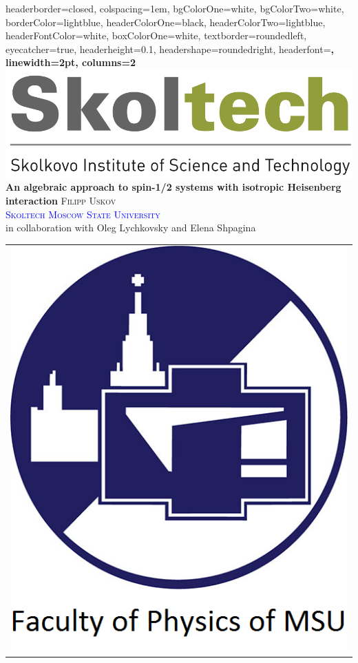 \documentclass[portratit,a1paper,fontscale=0.58]{baposter} %
\begin{document}
\begin{poster}
{
headerborder=closed, %
colspacing=1em, %
bgColorOne=white, %
bgColorTwo=white, %
borderColor=lightblue, %
headerColorOne=black, %
headerColorTwo=lightblue, %
headerFontColor=white, %
boxColorOne=white, %
textborder=roundedleft, %
eyecatcher=true, %
headerheight=0.1\textheight, %
headershape=roundedright, %
headerfont=\Large\bf\textsc, %
linewidth=2pt, %
columns=2
}
%
{\includegraphics[height=4 em]{skoltech_logo.png}} %
{
\bf{\LARGE An algebraic approach to spin-1/2 systems with isotropic Heisenberg interaction}
\vspace{0.4em}
} %
{\textsc{ \large Filipp Uskov  \\
\vspace{5 pt}
\textcolor{blue}{Skoltech}    \hspace{12pt} \textcolor{blue}{Moscow State University}
 }\\
 \vspace{3 pt}
{\small in collaboration with Oleg Lychkovsky and Elena Shpagina}} %
{
\begin{tabular}{c}
\includegraphics[height=4.5 em]{msuLogo.png}
\end{tabular}
} %




\end{poster}
\end{document}
